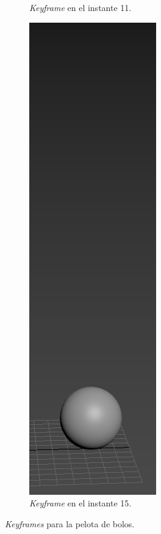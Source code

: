 \documentclass{article}
\begin{document}
\begin{figure}[H]
\begin{subfigure}[H]{0.15\textwidth}
	    \caption{\textit{Keyframe} en el instante 11.}
	\end{subfigure}
    \hfill
	\begin{subfigure}[H]{0.15\textwidth}
	    \centering
	    \includegraphics[width=\textwidth]{imagenes/Ejercicio 2/p2_15.png}
	    \caption{\textit{Keyframe} en el instante 15.}
	\end{subfigure}

    \caption{\textit{Keyframes} para la pelota de bolos.}
\end{figure}
\end{document}
